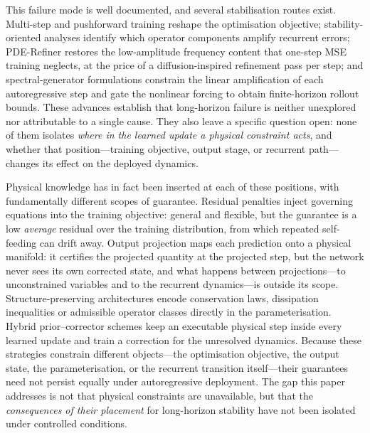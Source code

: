 \documentclass[11pt,a4paper]{article}
\begin{document}
This failure mode is well documented, and several stabilisation routes exist. Multi-step and pushforward training reshape the optimisation objective\cite{brandstetter2022mpnpde}; stability-oriented analyses identify which operator components amplify recurrent errors\cite{mccabe2023stability}; PDE-Refiner restores the low-amplitude frequency content that one-step MSE training neglects, at the price of a diffusion-inspired refinement pass per step\cite{lippe2023pderefiner}; and spectral-generator formulations constrain the linear amplification of each autoregressive step and gate the nonlinear forcing to obtain finite-horizon rollout bounds\cite{li2026sgno,zhang2026geoincno}. These advances establish that long-horizon failure is neither unexplored nor attributable to a single cause. They also leave a specific question open: none of them isolates \emph{where in the learned update a physical constraint acts}, and whether that position---training objective, output stage, or recurrent path---changes its effect on the deployed dynamics.

Physical knowledge has in fact been inserted at each of these positions, with fundamentally different scopes of guarantee. Residual penalties inject governing equations into the training objective\cite{raissi2019pinn,karniadakis2021,li2024pino,wang2021pideeponet,zanardi2023adaptive}: general and flexible, but the guarantee is a low \emph{average} residual over the training distribution, from which repeated self-feeding can drift away. Output projection maps each prediction onto a physical manifold\cite{valente2025projection}: it certifies the projected quantity at the projected step, but the network never sees its own corrected state, and what happens between projections---to unconstrained variables and to the recurrent dynamics---is outside its scope. Structure-preserving architectures encode conservation laws, dissipation inequalities or admissible operator classes directly in the parameterisation\cite{rao2023percnn,mohan2023hard,lee2021deepconservation,chen2024onsagernet,xiong2026pdco,chalapathi2024moe}. Hybrid prior--corrector schemes keep an executable physical step inside every learned update and train a correction for the unresolved dynamics\cite{wang2026ani,yin2021aphynity}. Because these strategies constrain different objects---the optimisation objective, the output state, the parameterisation, or the recurrent transition itself---their guarantees need not persist equally under autoregressive deployment. The gap this paper addresses is not that physical constraints are unavailable, but that the \emph{consequences of their placement} for long-horizon stability have not been isolated under controlled conditions.
\end{document}
